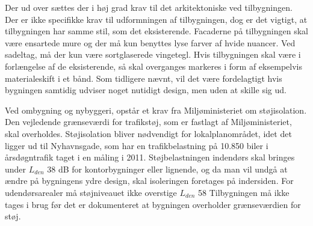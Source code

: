 Der ud over sættes der i høj grad krav til det arkitektoniske ved tilbygningen. Der er ikke specifikke krav til udformningen af tilbygningen, dog er det vigtigt, at tilbygningen har samme stil, som det eksisterende. Facaderne på tilbygningen skal være ensartede mure og der må kun benyttes lyse farver af hvide nuancer. Ved sadeltag, må der kun være sortglaserede vingetegl. Hvis tilbygningen skal være i forlængelse af de eksisterende, så skal overganges markeres i form af eksempelvis materialeskift i et bånd.  Som tidligere nævnt, vil det være fordelagtigt hvis bygningen samtidig udviser noget nutidigt design, men uden at skille sig ud. 

Ved ombygning og nybyggeri, opstår et krav fra Miljøministeriet om støjisolation. Den vejledende grænseværdi for trafikstøj, som er fastlagt af Miljøministeriet, skal overholdes. Støjisolation bliver nødvendigt for lokalplanområdet, idet det ligger ud til Nyhavnsgade, som har en trafikbelastning på 10.850 biler i årsdøgntrafik taget i en måling i 2011. Støjbelastningen indendørs skal bringes under $ L_{den} $ 38 dB for kontorbygninger eller lignende, og da man vil undgå at ændre på bygningens ydre design, skal isoleringen foretages på indersiden. For udendørsarealer må støjniveauet ikke overstige $ L_{den} $ 58 Tilbygningen må ikke tages i brug før det er dokumenteret at bygningen overholder grænseværdien for støj.
